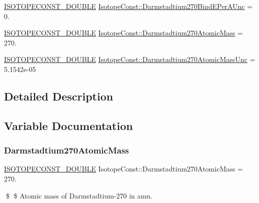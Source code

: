 \begin{DoxyCompactItemize}
\item 
\mbox{\hyperlink{group___isotope_const-_macros_ga8f45a7272ce02c0b4c65c44636ed719a}{I\+S\+O\+T\+O\+P\+E\+C\+O\+N\+S\+T\+\_\+\+D\+O\+U\+B\+LE}} \mbox{\hyperlink{group___isotope_const-_darmstadtium-_ds270_ga6a56bd2535e5cdc92b0349bc0bee4b79}{Isotope\+Const\+::\+Darmstadtium270\+Bind\+E\+Per\+A\+Unc}} = 0.
\item 
\mbox{\hyperlink{group___isotope_const-_macros_ga8f45a7272ce02c0b4c65c44636ed719a}{I\+S\+O\+T\+O\+P\+E\+C\+O\+N\+S\+T\+\_\+\+D\+O\+U\+B\+LE}} \mbox{\hyperlink{group___isotope_const-_darmstadtium-_ds270_ga1602ebe70d664bd8c467e6224240dfad}{Isotope\+Const\+::\+Darmstadtium270\+Atomic\+Mass}} = 270.
\item 
\mbox{\hyperlink{group___isotope_const-_macros_ga8f45a7272ce02c0b4c65c44636ed719a}{I\+S\+O\+T\+O\+P\+E\+C\+O\+N\+S\+T\+\_\+\+D\+O\+U\+B\+LE}} \mbox{\hyperlink{group___isotope_const-_darmstadtium-_ds270_gaeb9d164f42c4afebf4c6b0224640956c}{Isotope\+Const\+::\+Darmstadtium270\+Atomic\+Mass\+Unc}} = 5.\+1542e-\/05
\end{DoxyCompactItemize}


\subsection{Detailed Description}


\subsection{Variable Documentation}
\mbox{\label{group___isotope_const-_darmstadtium-_ds270_ga1602ebe70d664bd8c467e6224240dfad}} 
\subsubsection{\texorpdfstring{Darmstadtium270\+Atomic\+Mass}{Darmstadtium270AtomicMass}}
{\footnotesize\ttfamily \mbox{\hyperlink{group___isotope_const-_macros_ga8f45a7272ce02c0b4c65c44636ed719a}{I\+S\+O\+T\+O\+P\+E\+C\+O\+N\+S\+T\+\_\+\+D\+O\+U\+B\+LE}} Isotope\+Const\+::\+Darmstadtium270\+Atomic\+Mass = 270.}

\$ \$ Atomic mass of Darmstadtium-\/270 in amu. \mbox{\label{group___isotope_const-_darmstadtium-_ds270_gaeb9d164f42c4afebf4c6b0224640956c}} 
